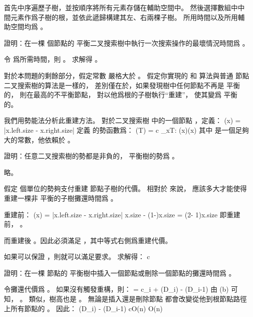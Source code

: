 \startANSWER
首先中序遍歷子樹，並按順序將所有元素存儲在輔助空間中。
然後選擇數組中中間元素作爲子樹的根，並依此遞歸構建其左、右兩棵子樹。
所用時間以及所用輔助空間均爲 。
\stopANSWER

\startigBase[continue]\startitem
證明：在一棵  個節點的 \m{\alpha} 平衡二叉搜索樹中執行一次搜索操作的最壞情況時間爲 。
\stopitem\stopigBase

\startANSWER
令  爲所需時間，則 。
求解得 。
\stopANSWER

對於本問題的剩餘部分，假定常數 \m{\alpha} 嚴格大於 。
假定你實現的  和  算法與普通  節點二叉搜索樹的算法是一樣的，
差別僅在於，如果發現樹中任何節點不再是 \m{\alpha} 平衡的，
則在最高的不平衡節點，
對以他爲根的子樹執行“重建”，
使其變爲  平衡的。

我們用勢能法分析此重建方法。
對於二叉搜索樹  中的一個節點 ，定義：
\startformula
\Delta(x) = |x.left.size - x.right.size|
\stopformula
定義  的勢函數爲：
\startformula
\Phi(T) = c \sum_{x\in T: \Delta(x)}\Delta(x)
\stopformula
其中  是一個足夠大的常數，他依賴於 \m{\alpha}。

\startigBase[continue]\startitem
證明：任意二叉搜索樹的勢都是非負的，  平衡樹的勢爲 。
\stopitem\stopigBase

\startANSWER
略。
\stopANSWER

\startigBase[continue]\startitem
假定  個單位的勢夠支付重建  節點子樹的代價。
相對於 \m{\alpha} 來說，  應該多大才能使得重建一棵非 \m{\alpha} 平衡的子樹攤還時間爲 。
\stopitem\stopigBase

\startANSWER
重建前：
\startformula
\Delta(x)
= |x.left.size - x.right.size|
\ge \alpha \cdot x.size - (1-\alpha)\cdot x.size
= (2\alpha - 1)\cdot x.size
\stopformula
即重建前， 。

而重建後 。因此必須滿足 ，其中等式右側爲重建代價。

如果可以保證 ，則就可以滿足要求。
求解得：
\startformula
c\ge {}
\stopformula
\stopANSWER

\startigBase[continue]\startitem
證明：在一棵  節點的 \m{\alpha} 平衡樹中插入一個節點或刪除一個節點的攤還時間爲 。
\stopitem\stopigBase

\startANSWER
令攤還代價爲 。
如果沒有觸發重構，則：
\startformula
{} = c_i + \Phi(D_i) - \Phi(D_{i-1})
\stopformula
由 (b) 可知， 。
類似，樹高也是 。
無論是插入還是刪除節點  都會改變從他到根節點路徑上所有節點的 。
因此：
\startformula
\Phi(D_i) - \Phi(D_{i-1}) \le c\cdot O(\lg n) \in O(\lg n)
\stopformula

